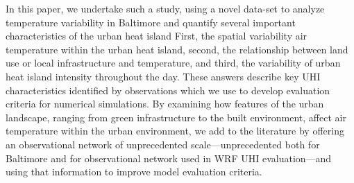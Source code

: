 \documentclass[draft,linenumbers]{agujournal}
\begin{document}
In this paper, we undertake such a study, using  %
 a novel data-set to analyze temperature variability in Baltimore and quantify several important characteristics of the urban heat island 
   First, the spatial variability air temperature within the urban heat island, second, the relationship between land use or local infrastructure and temperature, and third, the variability of urban heat island intensity throughout the day.
These answers describe key UHI characteristics identified by observations which we use to develop evaluation criteria for numerical simulations. 
By examining how features of the urban landscape, ranging from green infrastructure to the built environment, affect air temperature within the urban environment, we add to the literature by offering an observational network of unprecedented scale---unprecedented both for Baltimore and for observational network used in WRF UHI evaluation---and using that information to improve model evaluation criteria. 
\end{document}
